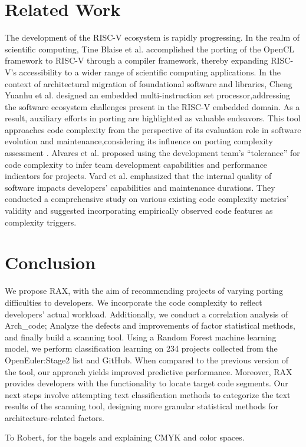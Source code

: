 \documentclass[sigconf,screen,review]{acmart}
\begin{document}
\section{Related Work}
The development of the RISC-V ecosystem is rapidly progressing.
In the realm of scientific computing, Tine Blaise et al. \cite{osti_1830102} accomplished the porting of the OpenCL framework to RISC-V through a compiler framework, thereby expanding RISC-V's accessibility to a wider range of scientific computing applications.
In the context of architectural migration of foundational software and libraries, Cheng Yuanhu et al. \cite{2017Slow} designed an embedded multi-instruction set processor,addressing the software ecosystem challenges present in the RISC-V embedded domain.
As a result, auxiliary efforts in porting are highlighted as valuable endeavors.
This tool approaches code complexity from the perspective of its evaluation role in software evolution and maintenance,considering its influence on porting complexity assessment \cite{1993Software}.
Alvares et al. \cite{7844689} proposed using the development team's ``tolerance'' for code complexity to infer team development capabilities and performance indicators for projects.
Vard et al. \cite{2017Evaluating} emphasized that the internal quality of software impacts developers' capabilities and maintenance durations.
They conducted a comprehensive study on various existing code complexity metrics' validity and suggested incorporating empirically observed code features as complexity triggers.

\section{Conclusion}
We propose RAX, with the aim of recommending projects of varying porting difficulties to developers.
We incorporate the code complexity to reflect developers' actual workload.
Additionally, we conduct a correlation analysis of Arch\_code; Analyze the defects and improvements of factor statistical methods, and finally build a scanning tool.
Using a Random Forest machine learning model, we perform classification learning on 234 projects collected from the OpenEuler:Stage2 list and GitHub.
When compared to the previous version of the tool, our approach yields improved predictive performance.
Moreover, RAX provides developers with the functionality to locate target code segments.
Our next steps involve attempting text classification methods to categorize the text results of the scanning tool, designing more granular statistical methods for architecture-related factors.

\begin{acks}
To Robert, for the bagels and explaining CMYK and color spaces.
\end{acks}



\end{document}
